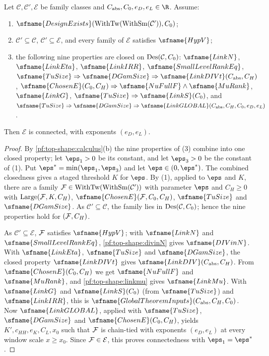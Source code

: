 \begin{theorem}[Assembly]\label{pf:top-shape:assembly}
Let $\mathcal C,\mathcal C',\mathcal E$ be family classes and $C_{\rm abs},C_0,e_D,e_L\in\R$. Assume:
\begin{enumerate}[label=(\arabic*)]
\item $\sfname{DesignExists}(\mathrm{WithTw}(\mathrm{WithSm}(\mathcal C')),C_0)$;
\item $\mathcal C'\subseteq\mathcal C$, $\mathcal C'\subseteq\mathcal E$, and every family of $\mathcal E$
satisfies $\sfname{HypV}$;
\item the following nine properties are closed on $\mathrm{Des}(\mathcal C,C_0)$: $\sfname{LinkN}$,
$\sfname{LinkEta}$, $\sfname{LinkIRR}$, $\sfname{SmallLevelRankEq}$,
$\sfname{TuSize}\Rightarrow\sfname{DGamSize}\Rightarrow\sfname{LinkDIVt}(C_{\rm abs},C_H)$,
$\sfname{ChosenE}(C_0,C_H)\Rightarrow\sfname{NuFullF}\wedge\sfname{MuRank}$, $\sfname{LinkG}$,
$\sfname{TuSize}\Rightarrow\sfname{LinkS}(C_0)$, and
$\sfname{TuSize}\Rightarrow\sfname{DGamSize}\Rightarrow\sfname{LinkGLOBAL}(C_{\rm abs},C_H,C_0,e_D,e_L)$.
\end{enumerate}
Then $\mathcal E$ is connected, with exponents $(e_D,e_L)$.
\end{theorem}

\begin{proof}
By \cref{pf:top-shape:calculus}(b) the nine properties of (3) combine into one closed property; let $\eps_1>0$
be its constant, and let $\eps_3>0$ be the constant of (1). Put $\eps^*=\min(\eps_1,\eps_3)$ and let
$\eps\in(0,\eps^*)$. The combined closedness gives a staged threshold $K$ for $\eps$. By (1), applied to $\eps$
and $K$, there are a family $\mathcal{F}\in\mathrm{WithTw}(\mathrm{WithSm}(\mathcal C'))$ with parameter $\eps$ and
$C_H\ge0$ with $\mathrm{Large}(\mathcal{F},K,C_H)$, $\sfname{ChosenE}(\topshapeF,C_0,C_H)$, $\sfname{TuSize}$ and
$\sfname{DGamSize}$. As $\mathcal C'\subseteq\mathcal C$, the family lies in $\mathrm{Des}(\mathcal C,C_0)$; hence
the nine properties hold for $(\mathcal{F},C_H)$.

As $\mathcal C'\subseteq\mathcal E$, $\mathcal{F}$ satisfies $\sfname{HypV}$; with $\sfname{LinkN}$ and
$\sfname{SmallLevelRankEq}$, \cref{pf:top-shape:divinN} gives $\sfname{DIVinN}$. With $\sfname{LinkEta}$,
$\sfname{TuSize}$ and $\sfname{DGamSize}$, the closed property $\sfname{LinkDIVt}$ gives
$\sfname{LinkDIV}(C_{\rm abs},C_H)$. From $\sfname{ChosenE}(C_0,C_H)$ we get $\sfname{NuFullF}$ and
$\sfname{MuRank}$, and \cref{pf:top-shape:linkmu} gives $\sfname{LinkMu}$. With $\sfname{LinkG}$ and
$\sfname{LinkS}(C_0)$ (from $\sfname{TuSize}$) and $\sfname{LinkIRR}$, this is
$\sfname{GlobalTheoremInputs}(C_{\rm abs},C_H,C_0)$. Now $\sfname{LinkGLOBAL}$, applied with
$\sfname{TuSize}$, $\sfname{DGamSize}$ and $\sfname{ChosenE}(C_0,C_H)$, yields $K',c_{HH},e_K,C_L,x_0$ such that
$\mathcal{F}$ is chain-tied with exponents $(e_D,e_L)$ at every window scale $x\ge x_0$. Since $\mathcal{F}\in\mathcal
E$, this proves connectedness with $\eps_1=\eps^*$.
\end{proof}

